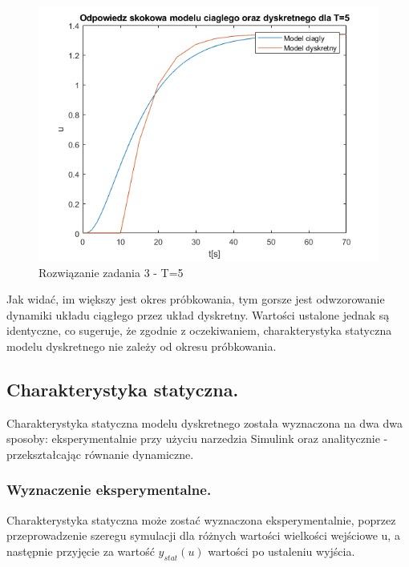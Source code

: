 \begin{figure}[H]
\centering
\includegraphics[width=15cm]{images/3.png}
\caption{Rozwiązanie zadania 3 - T=5}
\label{fig:3}
\end{figure}
Jak widać, im większy jest okres próbkowania, tym gorsze jest odwzorowanie dynamiki układu ciągłego przez układ dyskretny. Wartości ustalone jednak są identyczne, co sugeruje, że zgodnie z oczekiwaniem, charakterystyka statyczna modelu dyskretnego nie zależy od okresu próbkowania.
\subsection{Charakterystyka statyczna.}
Charakterystyka statyczna modelu dyskretnego została wyznaczona na dwa dwa sposoby: eksperymentalnie przy użyciu narzedzia Simulink oraz analitycznie - przekształcając równanie dynamiczne.
\subsubsection{Wyznaczenie eksperymentalne.}
Charakterystyka statyczna może zostać wyznaczona eksperymentalnie, poprzez przeprowadzenie szeregu symulacji dla różnych wartości wielkości wejściowe u, a następnie przyjęcie za wartość $y_{stat}(u)$ wartości po ustaleniu wyjścia.
